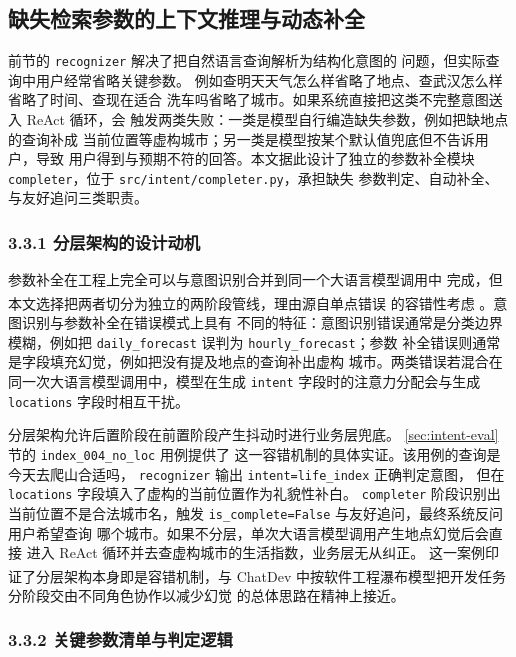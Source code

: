 \documentclass[a4paper]{article}
\theoremstyle{definition}
\theoremstyle{plain}
\theoremstyle{remark}
\let\oldcite\cite
\renewcommand{\cite}[1]{\textsuperscript{\oldcite{#1}}}
\newcommand{\bk}{\discretionary{}{}{}}
\begin{document}
\subsection{缺失检索参数的上下文推理与动态补全}
\label{sec:param-completion}

前节的 \texttt{recognizer} 解决了把自然语言查询解析为结构化意图的
问题，但实际查询中用户经常省略关键参数。
例如查明天天气怎么样省略了地点、查武汉怎么样省略了时间、查现在适合
洗车吗省略了城市。如果系统直接把这类不完整意图送入 ReAct 循环，会
触发两类失败：一类是模型自行编造缺失参数，例如把缺地点的查询补成
当前位置等虚构城市；另一类是模型按某个默认值兜底但不告诉用户，导致
用户得到与预期不符的回答。本文据此设计了独立的参数补全模块
\texttt{completer}，位于 \texttt{src/\bk{}intent/\bk{}completer.\bk{}py}，承担缺失
参数判定、自动补全、与友好追问三类职责。

\subsubsection*{3.3.1 \quad 分层架构的设计动机}

参数补全在工程上完全可以与意图识别合并到同一个大语言模型调用中
完成，但本文选择把两者切分为独立的两阶段管线，理由源自单点错误
的容错性考虑 \cite{ref10}。意图识别与参数补全在错误模式上具有
不同的特征：意图识别错误通常是分类边界模糊，例如把
\texttt{daily\_\bk{}forecast} 误判为 \texttt{hourly\_\bk{}forecast}；参数
补全错误则通常是字段填充幻觉，例如把没有提及地点的查询补出虚构
城市。两类错误若混合在同一次大语言模型调用中，模型在生成
\texttt{intent} 字段时的注意力分配会与生成 \texttt{locations}
字段时相互干扰。

分层架构允许后置阶段在前置阶段产生抖动时进行业务层兜底。
\ref{sec:intent-eval} 节的 \texttt{index\_\bk{}004\_\bk{}no\_\bk{}loc} 用例提供了
这一容错机制的具体实证。该用例的查询是今天去爬山合适吗，
\texttt{recognizer} 输出 \texttt{intent=\bk{}life\_\bk{}index} 正确判定意图，
但在 \texttt{locations} 字段填入了虚构的当前位置作为礼貌性补白。
\texttt{completer} 阶段识别出当前位置不是合法城市名，触发
\texttt{is\_\bk{}complete=\bk{}False} 与友好追问，最终系统反问用户希望查询
哪个城市。如果不分层，单次大语言模型调用产生地点幻觉后会直接
进入 ReAct 循环并去查虚构城市的生活指数，业务层无从纠正。
这一案例印证了分层架构本身即是容错机制，与 ChatDev \cite{ref29}
中按软件工程瀑布模型把开发任务分阶段交由不同角色协作以减少幻觉
的总体思路在精神上接近。

\subsubsection*{3.3.2 \quad 关键参数清单与判定逻辑}
\end{document}
